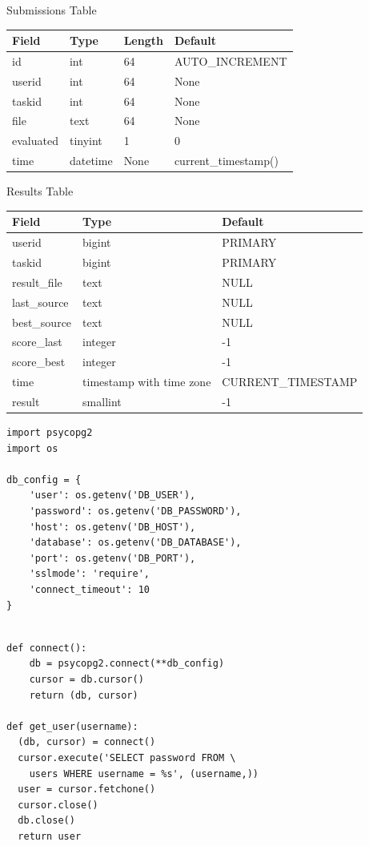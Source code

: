 \documentclass{beamer}
\begin{document}
		\begin{frame}{Submissions Table}
			\centering
			\begin{tabular}{|l|l|l|l|}
			\hline
			Field & Type & Length & Default \\
			\hline
			id & int & 64 & AUTO\_INCREMENT \\
			userid & int & 64 & None \\
			taskid & int & 64 & None \\
			file & text & 64 & None \\
			evaluated & tinyint & 1 & 0 \\
			time & datetime & None & current\_timestamp() \\
			\hline
			\end{tabular}
		\end{frame}

		\begin{frame}{Results Table}
			\small
			\centering
			\begin{tabular}{|l|l|l|}
			\hline
			Field & Type & Default \\
			\hline
			userid & bigint & PRIMARY \\
			taskid & bigint & PRIMARY \\
			result\_file & text & NULL \\
			last\_source & text & NULL \\
			best\_source & text & NULL \\
			score\_last & integer & -1 \\
			score\_best & integer & -1 \\
			time & timestamp with time zone & CURRENT\_TIMESTAMP \\
			result & smallint & -1 \\
			\hline
			\end{tabular}
		\end{frame}

		\begin{frame}[fragile]
			\begin{verbatim}
import psycopg2
import os

db_config = {
	'user': os.getenv('DB_USER'),
	'password': os.getenv('DB_PASSWORD'),
	'host': os.getenv('DB_HOST'),
	'database': os.getenv('DB_DATABASE'),
	'port': os.getenv('DB_PORT'),
	'sslmode': 'require',
	'connect_timeout': 10
}
			\end{verbatim}
		\end{frame}

		\begin{frame}[fragile]
			\begin{verbatim}

def connect():
	db = psycopg2.connect(**db_config)
	cursor = db.cursor()
	return (db, cursor)

def get_user(username):
  (db, cursor) = connect()
  cursor.execute('SELECT password FROM \
	users WHERE username = %s', (username,))
  user = cursor.fetchone()
  cursor.close()
  db.close()
  return user
	
			\end{verbatim}
		\end{frame}
\end{document}
